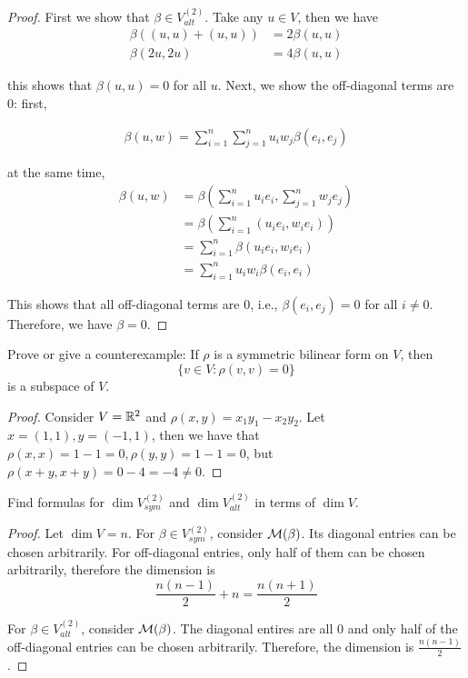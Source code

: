 \documentclass{extarticle}
\begin{document}
\begin{proof}
First we show that \(\beta \in V_{alt}^{(2)}\). Take any \(u \in V\), then we have 
\begin{align*}
    \beta((u, u) + (u, u)) &= 2 \beta(u, u) \\ 
    \beta(2u, 2u) &= 4 \beta(u, u)
\end{align*}

this shows that \(\beta(u, u) = 0\) for all \(u\). Next, we show the off-diagonal terms are 0: first, 

\begin{align*}
    \beta(u, w) = \sum_{i=1}^{n} \sum_{j=1}^{n} u_i w_j \beta(e_i, e_j) \tag*{bilinearity}
\end{align*}

at the same time, 
\begin{align*}
    \beta(u, w) &= \beta \left( \sum_{i=1}^{n}u_i e_i, \sum_{j=1}^{n} w_j e_j \right) \\ 
    &= \beta \left( \sum_{i=1}^{n} \left( u_i e_i, w_i e_i \right) \right) \\ 
    &= \sum_{i=1}^{n} \beta \left( u_i e_i, w_i e_i \right) \tag*{linearity on \(V \times V\)}  \\ 
    &= \sum_{i=1}^{n} u_i w_i \beta(e_i, e_i)
\end{align*}

This shows that all off-diagonal terms are 0, i.e., \(\beta(e_i, e_j) = 0\) for all \(i \neq 0\). Therefore, 
we have \(\beta = 0\).
\end{proof}

\begin{problem}{6}
    Prove or give a counterexample: If \(\rho\) is a symmetric bilinear form on \(V\), then 
    \[\{v \in V \colon \rho (v, v) = 0\}\]
    is a subspace of \(V\). 
\end{problem}

\begin{proof}
Consider \(V = \mathbb{R}^2\) and \(\rho(x, y) = x_1 y_1 - x_2 y_2\). Let \(x = (1, 1), y = (-1, 1 )\), then we 
have that \(\rho(x, x) = 1 - 1 = 0, \rho(y, y) = 1 - 1 = 0\), but \(\rho(x+y, x+y) = 0 - 4 = -4 \neq 0\).
\end{proof}

\begin{problem}{8}
    Find formulas for \(\dim V_{sym}^{(2)}\) and \(\dim V_{alt}^{(2)}\) in terms of \(\dim V\). 
\end{problem}

\begin{proof}
Let \(\dim V = n\). For \(\beta \in V_{sym}^{(2)}\), consider \(\mathcal{M}(\beta)\). Its diagonal entries can be 
chosen arbitrarily. For off-diagonal entries, only half of them can be chosen arbitrarily, therefore the dimension 
is 
\[\frac{n(n-1)}{2} + n = \frac{n(n+1)}{2}\]

For \(\beta \in V_{alt}^{(2)}\), consider \(\mathcal{M}(\beta)\). The diagonal entires are all 0 and only half of the off-diagonal entries 
can be chosen arbitrarily. Therefore, the dimension is 
\(\frac{n(n-1)}{2}\).
\end{proof}
\end{document}
